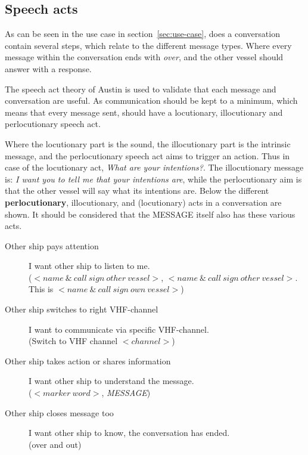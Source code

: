 \subsection{Speech acts}
As can be seen in the use case in section~\ref{sec:use-case}, does a conversation contain several steps, which relate to the different message types. Where every message within the conversation ends with \emph{over}, and the other vessel should answer with a response.

The speech act theory of Austin \cite{Austin1975} is used to validate that each message and conversation are useful. As communication should be kept to a minimum, which means that every message sent, should have a locutionary, illocutionary and perlocutionary speech act.

Where the locutionary part is the sound, the illocutionary part is the intrinsic message, and the perlocutionary speech act aims to trigger an action. Thus in case of the locutionary act, \emph{What are your intentions?}. The illocutionary message is: \emph{I want you to tell me that your intentions are}, while the perlocutionary aim is that the other vessel will say what its intentions are.
Below the different \textbf{perlocutionary}, illocutionary, and (locutionary) acts in a conversation are shown. It should be considered that the MESSAGE itself also has these various acts.

\begin{description}
	\item[Other ship pays attention] I want other ship to listen to me.\\ ($<name~\&~call~sign~other~vessel>$, $<name~\&~call~sign~other~vessel>$. This is $<name~\&~call~sign~own~vessel>$)
	\item[Other ship switches to right VHF-channel] I want to communicate via specific VHF-channel.\\ (Switch to VHF channel $<channel>$)
	\item[Other ship takes action or shares information] I want other ship to understand the message.\\ ($<marker~word>$, \emph{MESSAGE})
	\item[Other ship closes message too] I want other ship to know, the conversation has ended.\\ (over and out)
\end{description}

